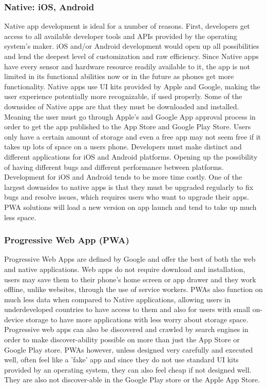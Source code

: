 \documentclass[draftclsnofoot, onecolumn, letterpaper,10pt,compsoc]{IEEEtran}
\begin{document}
\subsubsection{Native: iOS, Android}
Native app development is ideal for a number of reasons. First, developers get access to all available developer tools and APIs provided by the operating system's maker. iOS and/or Android development would open up all possibilities and lend the deepest level of customization and raw efficiency. Since Native apps have every sensor and hardware resource readily available to it, the app is not limited in its functional abilities now or in the future as phones get more functionality. Native apps use UI kits provided by Apple and Google, making the user experience potentially more recognizable, if used properly. Some of the downsides of Native apps are that they must be downloaded and installed. Meaning the user must go through Apple's and Google App approval process in order to get the app published to the App Store and Google Play Store. Users only have a certain amount of storage and even a free app may not seem free if it takes up lots of space on a users phone. Developers must make distinct and different applications for iOS and Android platforms. Opening up the possibility of having different bugs and different performance between platforms. Development for iOS and Android tends to be more time costly. One of the largest downsides to native apps is that they must be upgraded regularly to fix bugs and resolve issues, which requires users who want to upgrade their apps. PWA solutions will load a new version on app launch and tend to take up much less space.

\subsubsection{Progressive Web App (PWA)}
Progressive Web Apps are defined by Google and offer the best of both the web and native applications. Web apps do not require download and installation, users may save them to their phone's home screen or app drawer and they work offline, unlike websites, through the use of service workers. PWAs also function on much less data when compared to Native applications, allowing users in underdeveloped countries to have access to them and also for users with small on-device storage to have more applications with less worry about storage space. Progressive web apps can also be discovered and crawled by search engines in order to make discover-ability possible on more than just the App Store or Google Play store. PWAs however, unless designed very carefully and executed well, often feel like a 'fake' app and since they do not use standard UI kits provided by an operating system, they can also feel cheap if not designed well. They are also not discover-able in the Google Play store or the Apple App Store. 
\end{document}
